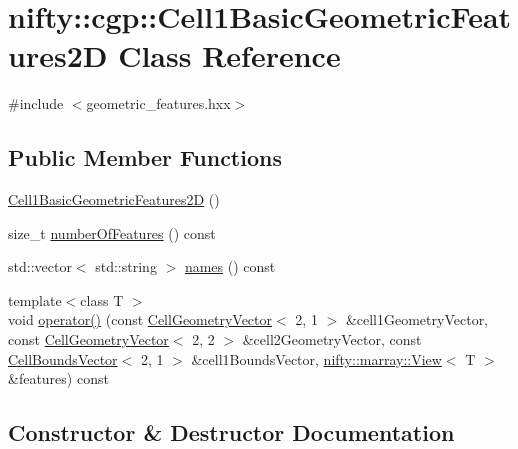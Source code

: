 \hypertarget{classnifty_1_1cgp_1_1Cell1BasicGeometricFeatures2D}{}\section{nifty\+:\+:cgp\+:\+:Cell1\+Basic\+Geometric\+Features2\+D Class Reference}
\label{classnifty_1_1cgp_1_1Cell1BasicGeometricFeatures2D}


{\ttfamily \#include $<$geometric\+\_\+features.\+hxx$>$}

\subsection*{Public Member Functions}
\begin{DoxyCompactItemize}
\item 
\hyperlink{classnifty_1_1cgp_1_1Cell1BasicGeometricFeatures2D_a21c1cd8100f7a511f5b500fd51527795}{Cell1\+Basic\+Geometric\+Features2\+D} ()
\item 
size\+\_\+t \hyperlink{classnifty_1_1cgp_1_1Cell1BasicGeometricFeatures2D_ad3d8a0e9bcdfdb30e86383b5d1a4fc26}{number\+Of\+Features} () const 
\item 
std\+::vector$<$ std\+::string $>$ \hyperlink{classnifty_1_1cgp_1_1Cell1BasicGeometricFeatures2D_a2dd928ab61a7e435057ddcded55f28c0}{names} () const 
\item 
{\footnotesize template$<$class T $>$ }\\void \hyperlink{classnifty_1_1cgp_1_1Cell1BasicGeometricFeatures2D_a0f9075ca73167de4b8f592ed3ea467a0}{operator()} (const \hyperlink{classnifty_1_1cgp_1_1CellGeometryVector}{Cell\+Geometry\+Vector}$<$ 2, 1 $>$ \&cell1\+Geometry\+Vector, const \hyperlink{classnifty_1_1cgp_1_1CellGeometryVector}{Cell\+Geometry\+Vector}$<$ 2, 2 $>$ \&cell2\+Geometry\+Vector, const \hyperlink{classnifty_1_1cgp_1_1CellBoundsVector}{Cell\+Bounds\+Vector}$<$ 2, 1 $>$ \&cell1\+Bounds\+Vector, \hyperlink{classandres_1_1View}{nifty\+::marray\+::\+View}$<$ T $>$ \&features) const 
\end{DoxyCompactItemize}


\subsection{Constructor \& Destructor Documentation}
\hypertarget{classnifty_1_1cgp_1_1Cell1BasicGeometricFeatures2D_a21c1cd8100f7a511f5b500fd51527795}{}
